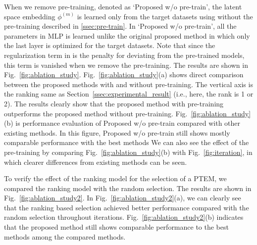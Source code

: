 When we remove pre-training, denoted as `Proposed w/o pre-train', the latent space embedding $\phi^{(m)}$ is learned only from the target datasets using  without the pre-training described in \ref{ssec:pre-train}.
%
In `Proposed w/o pre-train', all the parameters in MLP is learned unlike the original proposed method in which only the last layer is optimized for the target datasets.
%
Note that since the regularization term in  is the penalty for deviating from the pre-trained models, this term is vanished when we remove the pre-training.
%
The results are shown in Fig.~\ref{fig:ablation_study}. 
%
Fig.~\ref{fig:ablation_study}(a) shows direct comparison between the proposed methods with and without pre-training.
%
The vertical axis is the ranking same as Section~\ref{ssec:experimental_result} (i.e., here, the rank is 1 or 2).
%
The results clearly show that the proposed method with pre-training outperforms the proposed method without pre-training.
%
Fig.~\ref{fig:ablation_study}(b) is performance evaluation of Proposed w/o pre-train compared with other existing methods. 
%
In this figure, Proposed w/o pre-train still shows mostly comparable performance with the best methods
%
We can also see the effect of the pre-training by comparing Fig.~\ref{fig:ablation_study}(b) with Fig.~\ref{fig:iteration}, in which clearer differences from existing methods can be seen. 


To verify the effect of the ranking model for the selection of a PTEM, we compared the ranking model with the random selection.  
%
The results are shown in Fig.~\ref{fig:ablation_study2}.
%
In Fig.~\ref{fig:ablation_study2}(a), we can clearly see that the ranking based selection achieved better performance compared with the random selection throughout iterations. 
%
Fig.~\ref{fig:ablation_study2}(b) indicates that the proposed method still shows comparable performance to the best methods among the compared methods.  

